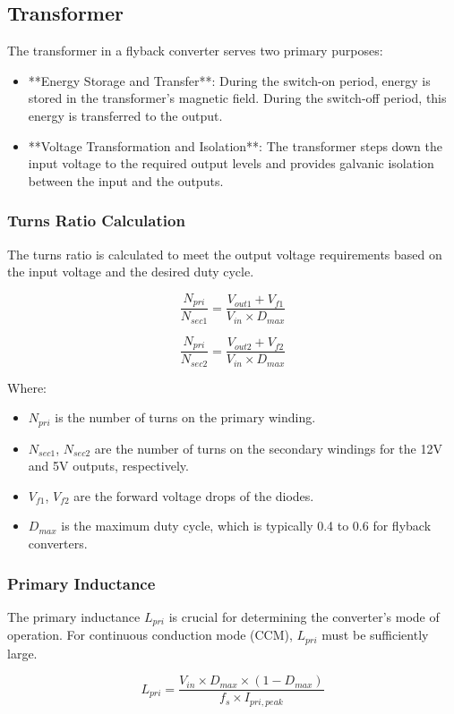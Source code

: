 \documentclass{article}
\begin{document}
\subsection{Transformer}
The transformer in a flyback converter serves two primary purposes:
\begin{itemize}
    \item **Energy Storage and Transfer**: During the switch-on period, energy is stored in the transformer's magnetic field. During the switch-off period, this energy is transferred to the output.
    \item **Voltage Transformation and Isolation**: The transformer steps down the input voltage to the required output levels and provides galvanic isolation between the input and the outputs.
\end{itemize}

\subsubsection{Turns Ratio Calculation}
The turns ratio is calculated to meet the output voltage requirements based on the input voltage and the desired duty cycle.

\[
\frac{N_{pri}}{N_{sec1}} = \frac{V_{out1} + V_{f1}}{V_{in} \times D_{max}}
\]

\[
\frac{N_{pri}}{N_{sec2}} = \frac{V_{out2} + V_{f2}}{V_{in} \times D_{max}}
\]

Where:
\begin{itemize}
    \item $N_{pri}$ is the number of turns on the primary winding.
    \item $N_{sec1}$, $N_{sec2}$ are the number of turns on the secondary windings for the 12V and 5V outputs, respectively.
    \item $V_{f1}$, $V_{f2}$ are the forward voltage drops of the diodes.
    \item $D_{max}$ is the maximum duty cycle, which is typically 0.4 to 0.6 for flyback converters.
\end{itemize}

\subsubsection{Primary Inductance}
The primary inductance $L_{pri}$ is crucial for determining the converter’s mode of operation. For continuous conduction mode (CCM), $L_{pri}$ must be sufficiently large.

\[
L_{pri} = \frac{V_{in} \times D_{max} \times (1 - D_{max})}{f_s \times I_{pri, peak}}
\]
\end{document}
